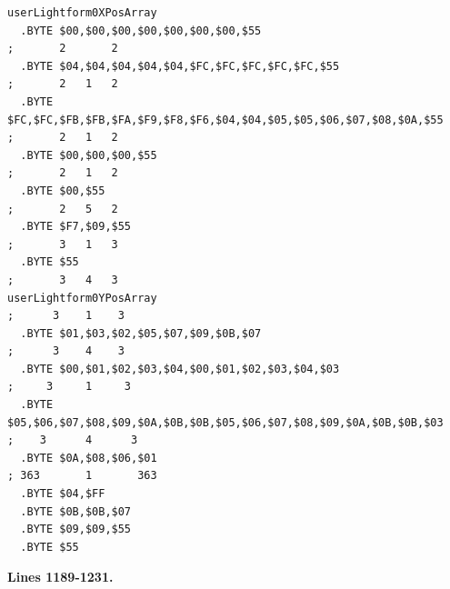 \begin{minipage}[b]{0.48\linewidth}
\vspace{1cm}
\begin{lrbox}{\mybox}%
\hspace{1cm}
\begin{lstlisting}[basicstyle=\ttfamily\tiny,escapechar=\%]
userLightform0XPosArray
  .BYTE $00,$00,$00,$00,$00,$00,$00,$55                                        ;       2       2      
  .BYTE $04,$04,$04,$04,$04,$FC,$FC,$FC,$FC,$FC,$55                            ;       2   1   2      
  .BYTE $FC,$FC,$FB,$FB,$FA,$F9,$F8,$F6,$04,$04,$05,$05,$06,$07,$08,$0A,$55    ;       2   1   2      
  .BYTE $00,$00,$00,$55                                                        ;       2   1   2      
  .BYTE $00,$55                                                                ;       2   5   2      
  .BYTE $F7,$09,$55                                                            ;       3   1   3      
  .BYTE $55                                                                    ;       3   4   3      
userLightform0YPosArray                                                        ;      3    1    3     
  .BYTE $01,$03,$02,$05,$07,$09,$0B,$07                                        ;      3    4    3     
  .BYTE $00,$01,$02,$03,$04,$00,$01,$02,$03,$04,$03                            ;     3     1     3    
  .BYTE $05,$06,$07,$08,$09,$0A,$0B,$0B,$05,$06,$07,$08,$09,$0A,$0B,$0B,$03    ;    3      4      3   
  .BYTE $0A,$08,$06,$01                                                        ; 363       1       363
  .BYTE $04,$FF
  .BYTE $0B,$0B,$07
  .BYTE $09,$09,$55                                                         
  .BYTE $55
\end{lstlisting}
\end{lrbox}%
\scalebox{0.8}{\usebox{\mybox}}

\end{minipage}
%
\clearpage
\textbf{Lines 1189-1231. } 
